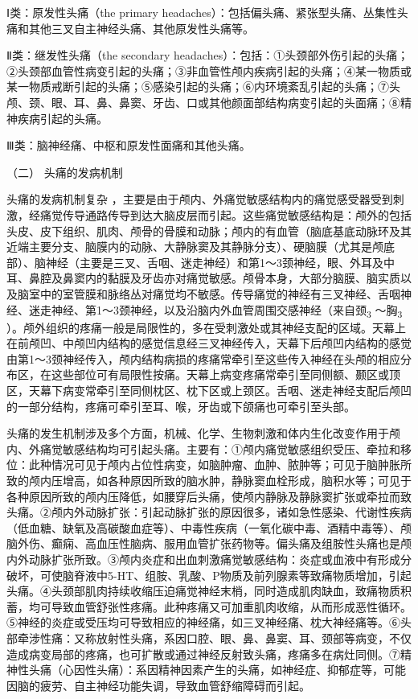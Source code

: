 Ⅰ类：原发性头痛（the primary
headaches）：包括偏头痛、紧张型头痛、丛集性头痛和其他三叉自主神经头痛、其他原发性头痛等。

Ⅱ类：继发性头痛（the secondary
headaches）：包括：①头颈部外伤引起的头痛；②头颈部血管性病变引起的头痛；③非血管性颅内疾病引起的头痛；④某一物质或某一物质戒断引起的头痛；⑤感染引起的头痛；⑥内环境紊乱引起的头痛；⑦头颅、颈、眼、耳、鼻、鼻窦、牙齿、口或其他颜面部结构病变引起的头面痛；⑧精神疾病引起的头痛。

Ⅲ类：脑神经痛、中枢和原发性面痛和其他头痛。

\hypertarget{text00020.htmlux5cux23CHP1-7-1-2}{}
（二） 头痛的发病机制

头痛的发病机制复杂
，主要是由于颅内、外痛觉敏感结构内的痛觉感受器受到刺激，经痛觉传导通路传导到达大脑皮层而引起。这些痛觉敏感结构是：颅外的包括头皮、皮下组织、肌肉、颅骨的骨膜和动脉；颅内的有血管（脑底基底动脉环及其近端主要分支、脑膜内的动脉、大静脉窦及其静脉分支）、硬脑膜（尤其是颅底部）、脑神经（主要是三叉、舌咽、迷走神经）和第1～3颈神经，眼、外耳及中耳、鼻腔及鼻窦内的黏膜及牙齿亦对痛觉敏感。颅骨本身，大部分脑膜、脑实质以及脑室中的室管膜和脉络丛对痛觉均不敏感。传导痛觉的神经有三叉神经、舌咽神经、迷走神经、第1～3颈神经，以及沿脑内外血管周围交感神经（来自颈\textsubscript{3}
～胸\textsubscript{3}
）。颅外组织的疼痛一般是局限性的，多在受刺激处或其神经支配的区域。天幕上在前颅凹、中颅凹内结构的感觉信息经三叉神经传入，天幕下后颅凹内结构的感觉由第1～3颈神经传入，颅内结构病损的疼痛常牵引至这些传入神经在头颅的相应分布区，在这些部位可有局限性按痛。天幕上病变疼痛常牵引至同侧额、颞区或顶区，天幕下病变常牵引至同侧枕区、枕下区或上颈区。舌咽、迷走神经支配后颅凹的一部分结构，疼痛可牵引至耳、喉，牙齿或下颌痛也可牵引至头部。

头痛的发生机制涉及多个方面，机械、化学、生物刺激和体内生化改变作用于颅内、外痛觉敏感结构均可引起头痛。主要有：①颅内痛觉敏感组织受压、牵拉和移位：此种情况可见于颅内占位性病变，如脑肿瘤、血肿、脓肿等；可见于脑肿胀所致的颅内压增高，如各种原因所致的脑水肿，静脉窦血栓形成，脑积水等；可见于各种原因所致的颅内压降低，如腰穿后头痛，使颅内静脉及静脉窦扩张或牵拉而致头痛。②颅内外动脉扩张：引起动脉扩张的原因很多，诸如急性感染、代谢性疾病（低血糖、缺氧及高碳酸血症等）、中毒性疾病（一氧化碳中毒、酒精中毒等）、颅脑外伤、癫痫、高血压性脑病、服用血管扩张药物等。偏头痛及组胺性头痛也是颅内外动脉扩张所致。③颅内炎症和出血刺激痛觉敏感结构：炎症或血液中有形成分破坏，可使脑脊液中5-HT、组胺、乳酸、P物质及前列腺素等致痛物质增加，引起头痛。④头颈部肌肉持续收缩压迫痛觉神经末梢，同时造成肌肉缺血，致痛物质积蓄，均可导致血管舒张性疼痛。此种疼痛又可加重肌肉收缩，从而形成恶性循环。⑤神经的炎症或受压均可导致相应的神经痛，如三叉神经痛、枕大神经痛等。⑥头部牵涉性痛：又称放射性头痛，系因口腔、眼、鼻、鼻窦、耳、颈部等病变，不仅造成病变局部的疼痛，也可扩散或通过神经反射致头痛，疼痛多在病灶同侧。⑦精神性头痛（心因性头痛）：系因精神因素产生的头痛，如神经症、抑郁症等，可能因脑的疲劳、自主神经功能失调，导致血管舒缩障碍而引起。

